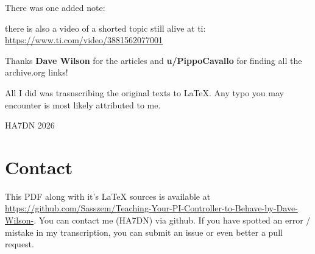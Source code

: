 \documentclass[11pt,a4paper]{report}
\begin{document}
    There was one added note:
    \begin{displayquote}
         there is also a video of a shorted topic still alive at ti: \url{https://www.ti.com/video/3881562077001}
    \end{displayquote}

    Thanks \textbf{Dave Wilson} for the articles and \textbf{u/PippoCavallo} for finding all the archive.org links!

    All I did was trasnscribing the original texts to \LaTeX. Any typo you may encounter is most likely attributed to me.

    HA7DN 2026

    \chapter*{Contact}

    This PDF along with it's \LaTeX\; sources is available at \url{https://github.com/Sasszem/Teaching-Your-PI-Controller-to-Behave-by-Dave-Wilson-}. You can contact me (HA7DN) via github. If you have spotted an error / mistake in my transcription, you can submit an issue or even better a pull request.
\end{document}
